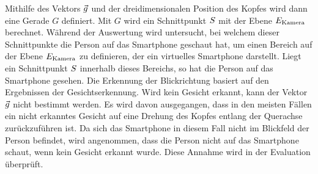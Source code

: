 Mithilfe des Vektors $\vec{g}$ und der dreidimensionalen Position des Kopfes wird dann eine Gerade $G$ definiert. Mit $G$ wird ein Schnittpunkt $S$ mit der Ebene $E_{\text{Kamera}}$ berechnet. Während der Auswertung wird untersucht, bei welchem dieser Schnittpunkte die Person auf das Smartphone geschaut hat, um einen Bereich auf der Ebene $E_{\text{Kamera}}$ zu definieren, der ein virtuelles Smartphone darstellt. Liegt ein Schnittpunkt $S$ innerhalb dieses Bereichs, so hat die Person auf das Smartphone gesehen. Die Erkennung der Blickrichtung basiert auf den Ergebnissen der Gesichtserkennung. Wird kein Gesicht erkannt, kann der Vektor $\vec{g}$ nicht bestimmt werden. Es wird davon ausgegangen, dass in den meisten Fällen ein nicht erkanntes Gesicht auf eine Drehung des Kopfes entlang der Querachse zurückzuführen ist. Da sich das Smartphone in diesem Fall nicht im Blickfeld der Person befindet, wird angenommen, dass die Person nicht auf das Smartphone schaut, wenn kein Gesicht erkannt wurde. Diese Annahme wird in der Evaluation überprüft.













